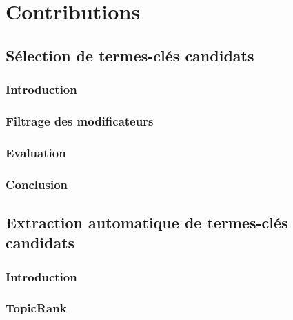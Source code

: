 \part{Contributions}
\label{part:main-contributions}


  \chapter{Sélection de termes-clés candidats}
  \label{chap:main-contributions-keyphrase_candidate_selection}
    \section{Introduction}
    \label{sec:main-contributions-keyphrase_candidate_selection-introduction}

    \section{Filtrage des modificateurs}
    \label{sec:main-contributions-keyphrase_candidate_selection-modifiers_filtering}

    \section{Evaluation}
    \label{sec:main-contributions-keyphrase_candidate_selection-evaluation}

    \section{Conclusion}
    \label{sec:main-contributions-keyphrase_candidate_selection-conclusion}


  \chapter{Extraction automatique de termes-clés candidats}
  \label{chap:main-contributions-automatic_keyphrase_extraction}
    \section{Introduction}
    \label{sec:main-contributions-automatic_keyphrase_extraction-introduction}

    \section{TopicRank}
    \label{sec:main-contributions-automatic_keyphrase_extraction-modifiers_filtering}
      \cite{bougouin2013topicrank}

